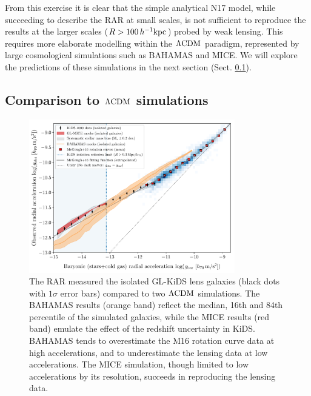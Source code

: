\documentclass[usenatbib]{mnras}
\newcommand{\hkpc}{\, h^{-1}{\rm{kpc}} }
\newcommand{\lcdm}{{\rm \Lambda CDM}}
\begin{document}
From this exercise it is clear that the simple analytical N17 model, while succeeding to describe the RAR at small scales, is not sufficient to reproduce the results at the larger scales ($R > 100 \hkpc$) probed by weak lensing. This requires more elaborate modelling within the $\lcdm$ paradigm, represented by large cosmological simulations such as BAHAMAS and MICE. We will explore the predictions of these simulations in the next section (Sect. \ref{sec:results-simulations}).


\subsection{Comparison to $\lcdm$ simulations}
\label{sec:results-simulations}

\begin{figure}
	\includegraphics[width=0.8\textwidth]{Figures/RAR_KiDS+MICE+Bahamas_No_Nobins_isolated_zoomout.pdf}
	\caption{The RAR measured the isolated GL-KiDS lens galaxies (black dots with $1\sigma$ error bars) compared to two $\lcdm$ simulations. The BAHAMAS results (orange band) reflect the median, 16th and 84th percentile of the simulated galaxies, while the MICE results (red band) emulate the effect of the redshift uncertainty in KiDS. BAHAMAS tends to overestimate the M16 rotation curve data at high accelerations, and to underestimate the lensing data at low accelerations. The MICE simulation, though limited to low accelerations by its resolution, succeeds in reproducing the lensing data.}
	\label{fig:RAR_kids_mice_bahamas}
\end{figure}
\end{document}
